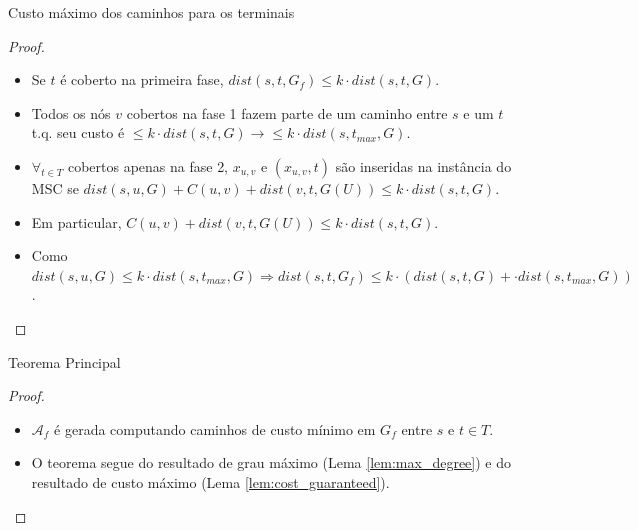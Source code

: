 \documentclass[10pt]{beamer}
\begin{document}
\begin{frame}{Custo máximo dos caminhos para os terminais \hyperlink{cost_guaranteed}{}}
\hypertarget{cost_guaranteed_slide}{}
  \begin{proof}%
    \begin{itemize}
      \item <1-> Se $t$ é coberto na primeira fase, $dist(s, t, G_f) \le k \cdot dist(s,t,G)$. 
      \item <2-> Todos os nós $v$ cobertos na fase 1 fazem parte de um caminho entre $s$ e um $t$ t.q. seu custo é $\le k \cdot dist(s,t,G) \rightarrow \le k \cdot dist(s,t_{max},G)$.
      \item <3-> $\forall_{t \in T}$ cobertos apenas na fase 2, $x_{u,v}$ e $(x_{u,v},t)$ são inseridas na instância do MSC se $dist(s, u, G)+C(u,v)+dist(v,t,G(U)) \leq k \cdot dist(s,t,G)$.
      \item <4-> Em particular, $C(u,v)+dist(v,t,G(U)) \le k \cdot dist(s,t,G)$.
      \item <5-> Como $dist(s, u, G) \le k \cdot dist(s,t_{max},G) \Rightarrow dist(s,t,G_f) \leq k \cdot (dist(s,t,G) + \cdot dist(s,t_{max},G))$.
    \end{itemize}
  \end{proof}
\end{frame}

\begin{frame}{Teorema Principal \hyperlink{final_theorem}{}}
\hypertarget{final_theorem_slide}{}
  \begin{proof}%
    \begin{itemize}
      \item <2-> $\mathcal{A}_f$ é gerada computando caminhos de custo mínimo em $G_f$ entre $s$ e $t \in T$.
      \item <3-> O teorema segue do resultado de grau máximo (Lema \ref{lem:max_degree}) e do resultado de custo máximo (Lema \ref{lem:cost_guaranteed}).
    \end{itemize}
  \end{proof}
\end{frame}
\end{document}
